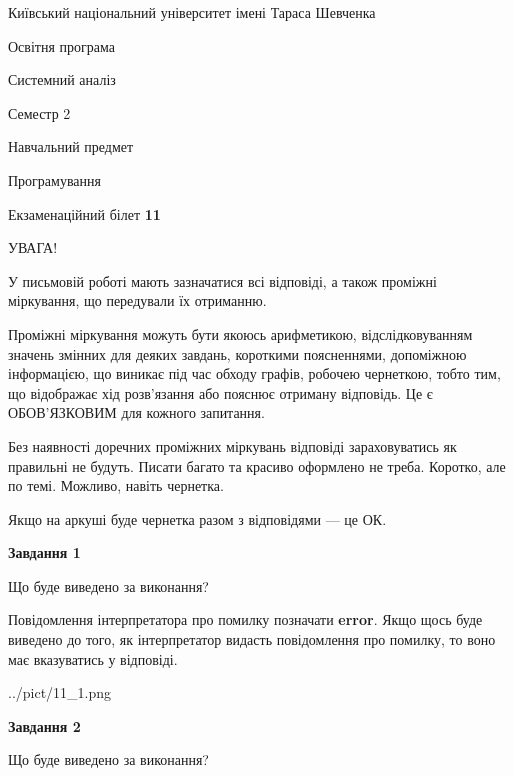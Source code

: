 \documentclass[12pt, ukrainian]{article}
\begin{document}
{{\begin {small}\par
{ \center  Київський національний університет імені Тараса Шевченка \par}
{\parbox {5 cm}{Освітня програма \hfill}{\parbox {7 cm}{Системний аналіз \hfill}}\parbox {6 cm}{\hfill Семестр 2}}\par
{\parbox {5 cm} {Навчальний предмет \hfill}\parbox {7 cm}{Програмування \hfill}\parbox {6cm}{\hfill}\par}\vspace{-7pt} \end{small}}{\center Екзаменаційний білет \No \textbf
{ 11 }\par}}
{
\begin {large}
УВАГА!

У письмовій роботі мають зазначатися всі відповіді, а також проміжні міркування, що передували їх отриманню.

Проміжні міркування можуть бути якоюсь арифметикою, відслідковуванням зна\-чень змінних для деяких завдань,
короткими поясненнями, допоміжною інформацією, що виникає під час обходу графів, робочею чернеткою,
тобто тим, що відображає хід розв’язання або пояснює отриману відповідь.
Це є ОБОВ’ЯЗКОВИМ для кожного запитання.

Без наявності доречних проміжних міркувань відповіді зараховуватись як правиль\-ні не будуть.
Писати багато та красиво оформлено не треба. Коротко, але по темі. Можли\-во, навіть чернетка.

Якщо на аркуші буде чернетка разом з відповідями --- це ОК.

\newpage

{\begin {center}\textbf{Завдання 1}\end {center}}\par
Що буде виведено за виконання?

Повідомлення інтерпретатора про помилку позначати \textbf{error}.
Якщо щось буде виведено до того, як інтерпретатор видасть повідомлення про помилку, 
то воно має вказуватись у відповіді. \par


\begin{center}
	{../pict/11_1.png}
\end{center}
\newpage

{\begin {center}\textbf{Завдання 2}\end {center}}\par
Що буде виведено за виконання?


\end{large}}
\end{document}
